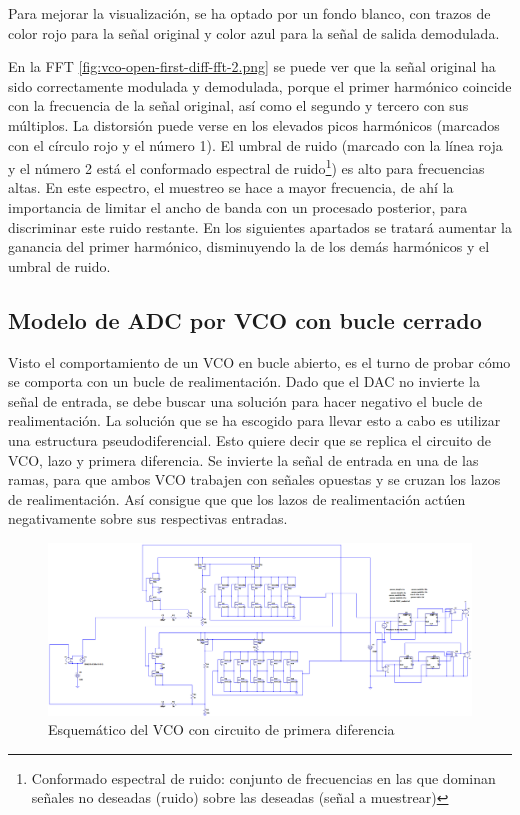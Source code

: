 \documentclass[12pt]{report} %
\begin{document}
	Para mejorar la visualización, se ha optado por un fondo blanco, con trazos de color rojo para la señal original y color azul para la señal de salida demodulada.
	
	En la FFT \ref{fig:vco-open-first-diff-fft-2.png} se puede ver que la señal original ha sido correctamente modulada y demodulada, porque el primer harmónico coincide con la frecuencia de la señal original, así como el segundo y tercero con sus múltiplos. La distorsión puede verse en los elevados picos harmónicos (marcados con el círculo rojo y el número 1). El umbral de ruido (marcado con la línea roja y el número 2 está el conformado espectral de ruido\footnote{Conformado espectral de ruido: conjunto de frecuencias en las que dominan señales no deseadas (ruido) sobre las deseadas (señal a muestrear)}) es alto para frecuencias altas. En este espectro, el muestreo se hace a mayor frecuencia, de ahí la importancia de limitar el ancho de banda con un procesado posterior, para discriminar este ruido restante. En los siguientes apartados se tratará aumentar la ganancia del primer harmónico, disminuyendo la de los demás harmónicos y el umbral de ruido.
	
	\subsection{Modelo de ADC por VCO con bucle cerrado}\label{ss:vco-open}
	
	Visto el comportamiento de un VCO en bucle abierto, es el turno de probar cómo se comporta con un bucle de realimentación. Dado que el DAC no invierte la señal de entrada, se debe buscar una solución para hacer negativo el bucle de realimentación. La solución que se ha escogido para llevar esto a cabo es utilizar una estructura pseudodiferencial. Esto quiere decir que se replica el circuito de VCO, lazo y primera diferencia. Se invierte la señal de entrada en una de las ramas, para que ambos VCO trabajen con señales opuestas y se cruzan los lazos de realimentación. Así consigue que que los lazos de realimentación actúen negativamente sobre sus respectivas entradas.
	
	\begin{figure}[H]
		\includegraphics[width=\textwidth]{ltspice-vco-closed-diff.png}
		\caption[Esquemático del VCO con circuito de primera diferencia]{Esquemático del VCO con circuito de primera diferencia}
		\label{fig:ltspice-vco-closed-diff.png}
	\end{figure}
\end{document}
